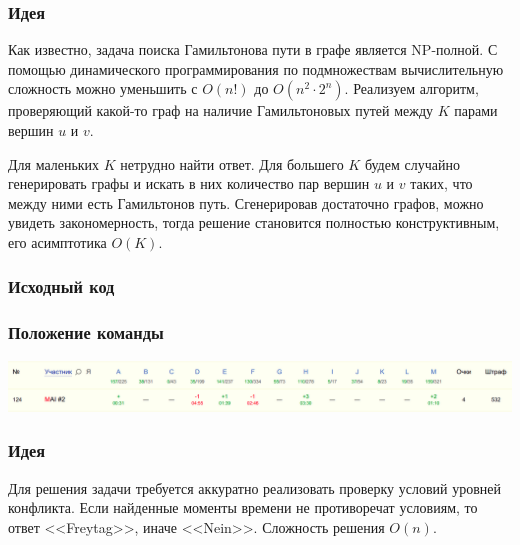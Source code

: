 \documentclass[12pt]{article}
\begin{document}

\subsubsection*{Идея}
Как известно, задача поиска Гамильтонова пути в графе является NP-полной. С помощью динамического программирования по подмножествам вычислительную сложность можно уменьшить с $O(n!)$ до $O(n ^ 2 \cdot 2 ^ n)$. Реализуем алгоритм, проверяющий какой-то граф на наличие Гамильтоновых путей между $K$ парами вершин $u$ и $v$.

Для маленьких $K$ нетрудно найти ответ. Для большего $K$ будем случайно генерировать графы и искать в них количество пар вершин $u$ и $v$ таких, что между ними есть Гамильтонов путь. Сгенерировав достаточно графов, можно увидеть закономерность, тогда решение становится полностью конструктивным, его асимптотика $O(K)$.

\subsubsection*{Исходный код}

\subsubsection*{Положение команды}
\includegraphics[scale=0.25]{images/gp_imo.png}\newline\noindent
\pagebreak


\subsubsection*{Идея}
Для решения задачи требуется аккуратно реализовать проверку условий уровней конфликта. Если найденные моменты времени не противоречат условиям, то ответ <<Freytag>>, иначе <<Nein>>. Сложность решения $O(n)$.
\end{document}
